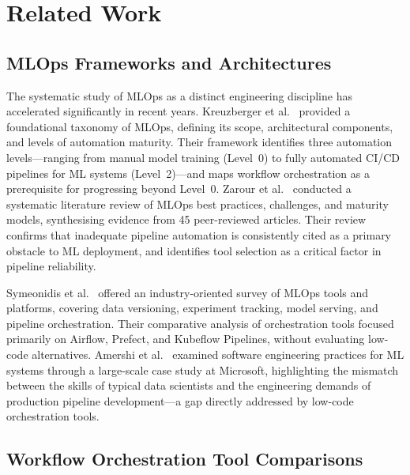 \documentclass[journal]{IEEEtran}
\begin{document}
\section{Related Work}
\label{sec:relatedwork}

\subsection{MLOps Frameworks and Architectures}

The systematic study of MLOps as a distinct engineering discipline has
accelerated significantly in recent years. Kreuzberger et al.~\cite{kreuzberger2023mlops}
provided a foundational taxonomy of MLOps, defining its scope,
architectural components, and levels of automation maturity. Their
framework identifies three automation levels---ranging from manual
model training (Level~0) to fully automated CI/CD pipelines for ML
systems (Level~2)---and maps workflow orchestration as a prerequisite
for progressing beyond Level~0. Zarour et al.~\cite{zarour2025mlops}
conducted a systematic literature review of MLOps best practices,
challenges, and maturity models, synthesising evidence from 45
peer-reviewed articles. Their review confirms that inadequate pipeline
automation is consistently cited as a primary obstacle to ML deployment,
and identifies tool selection as a critical factor in pipeline reliability.

Symeonidis et al.~\cite{symeonidis2022mlops} offered an industry-oriented
survey of MLOps tools and platforms, covering data versioning, experiment
tracking, model serving, and pipeline orchestration. Their comparative
analysis of orchestration tools focused primarily on Airflow, Prefect,
and Kubeflow Pipelines, without evaluating low-code alternatives.
Amershi et al.~\cite{amershi2019software} examined software engineering
practices for ML systems through a large-scale case study at Microsoft,
highlighting the mismatch between the skills of typical data scientists
and the engineering demands of production pipeline development---a gap
directly addressed by low-code orchestration tools.

\subsection{Workflow Orchestration Tool Comparisons}
\end{document}
